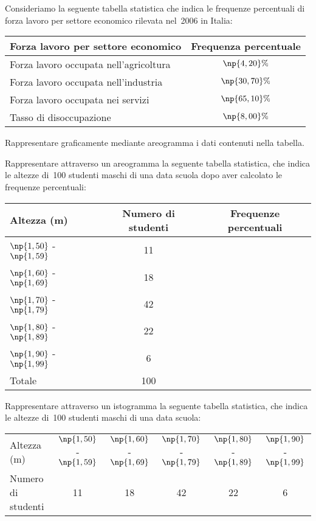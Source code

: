 \begin{esercizio}
\label{ese:A.17}
Consideriamo la seguente tabella statistica che indica le frequenze percentuali di forza lavoro per settore economico rilevata nel~2006 in Italia:
\begin{center}
\begin{tabular}{lc}
\toprule
Forza lavoro per settore economico & Frequenza percentuale\\
\midrule
Forza lavoro occupata nell'agricoltura & $\np{4,20}\%$\\
Forza lavoro occupata nell'industria & $\np{30,70}\%$\\
Forza lavoro occupata nei servizi & $\np{65,10}\%$\\
Tasso di disoccupazione & $\np{8,00}\%$\\
\bottomrule
\end{tabular}
\end{center}
Rappresentare graficamente mediante areogramma i dati contenuti nella tabella.
\end{esercizio}

\begin{esercizio}
\label{ese:A.18}
Rappresentare attraverso un areogramma la seguente tabella statistica, che indica le altezze di~100 studenti maschi
di una data scuola dopo aver calcolato le frequenze percentuali:
\begin{center}
\begin{tabular}{l*{2}{c}}
\toprule
Altezza (m) & Numero di studenti & Frequenze percentuali\\
\midrule
$\np{1,50}$ - $\np{1,59}$ & 11 & \\
$\np{1,60}$ - $\np{1,69}$ & 18 & \\
$\np{1,70}$ - $\np{1,79}$ & 42 & \\
$\np{1,80}$ - $\np{1,89}$ & 22 & \\
$\np{1,90}$ - $\np{1,99}$ & 6 & \\
\midrule
Totale & 100 & \\
\bottomrule
\end{tabular}
\end{center}

\end{esercizio}

\begin{esercizio}
\label{ese:A.19}
Rappresentare attraverso un istogramma la seguente tabella statistica, che indica le altezze di~100 studenti maschi di una data scuola:
\begin{center}
\begin{tabular}{l*{5}{c}}
\toprule
Altezza (m) & $\np{1,50}$ - $\np{1,59}$ & $\np{1,60}$ - $\np{1,69}$ & $\np{1,70}$ - $\np{1,79}$ & $\np{1,80}$ - $\np{1,89}$ & $\np{1,90}$ - $\np{1,99}$\\
Numero di studenti & 11 & 18 & 42 & 22 & 6 \\
\bottomrule
\end{tabular}
\end{center}
\end{esercizio}

